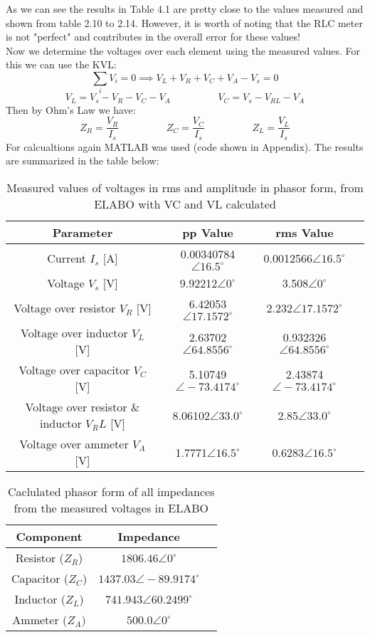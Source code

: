 \documentclass[12pt]{report}
\begin{document}
As we can see the results in Table 4.1 are pretty close to the values measured and shown from table 2.10 to 2.14. However, it is worth of noting that the RLC meter is not "perfect" and contributes in the overall error for these values! \\Now we determine the voltages over each element using the measured values. 
\vspace{0.5cm}
For this we can use the KVL: 
$$\sum_i V_i = 0 \implies V_L + V_R + V_C+V_A-V_s = 0 $$
$$ V_L = V_s- V_R - V_C - V_A \hspace{2cm} V_C =  V_s- V_{RL} -V_A $$
Then by Ohm's Law we have:
$$Z_R = \frac{V_R}{I_s} \hspace{2cm} Z_C = \frac{V_C}{I_s} \hspace{2cm} Z_L = \frac{V_L}{I_s}  $$
For calcualtions again MATLAB was used (code shown in Appendix). The results are summarized in the table below:
\renewcommand{\arraystretch}{1.5}
\begin{table}[ht]
\centering
\begin{tabular}{|c|c|c|c|}
\hline
\rowcolor{lightblue} \textbf{Parameter}  &\textbf {pp Value} & \textbf{rms Value}  \\
\hline
Current $I_s$ [A] & 0.00340784$\angle16.5^\circ$ & 0.0012566$\angle16.5^\circ$ \\
\hline
Voltage $V_s$ [V] & 9.92212$\angle0^\circ$  & 3.508$\angle0^\circ$ \\
\hline
Voltage over resistor $V_R$ [V]  & 6.42053$\angle17.1572^\circ$ &  2.232$\angle17.1572^\circ$ \\
\hline
Voltage over inductor $V_L$ [V] & 2.63702$\angle64.8556^\circ$ &  0.932326$\angle64.8556^\circ$ \\
\hline
Voltage over capacitor $V_C$ [V] &  5.10749$\angle-73.4174^\circ$ & 2.43874$\angle-73.4174^\circ$\\
\hline
Voltage over resistor \& inductor $V_RL$ [V] & 8.06102$\angle33.0^\circ$ & 2.85$\angle33.0^\circ$ \\
\hline
Voltage over ammeter $V_A$ [V]& 1.7771$\angle16.5^\circ$ & 0.6283$\angle16.5^\circ$ \\
\hline
\end{tabular}
\caption{Measured values of voltages in rms and amplitude in phasor form, from ELABO with VC and VL calculated}
\end{table}
\vspace{-0.5cm}
\begin{table}[ht]
\centering
\begin{tabular}{|c|c|c|}
\hline
\rowcolor{lightblue} \textbf{Component} & \textbf{Impedance} \\
\hline
Resistor ($Z_R$) & $1806.46\angle0^\circ$ \\
\hline
Capacitor ($Z_C$) & $1437.03\angle-89.9174^\circ$ \\
\hline
Inductor ($Z_L$) & $741.943\angle60.2499^\circ$ \\
\hline
Ammeter ($Z_A)$ & $500.0\angle0^\circ$  \\
\hline
\end{tabular}
\caption{Caclulated phasor form of all impedances from the measured voltages in ELABO} 
\end{table}
\end{document}
